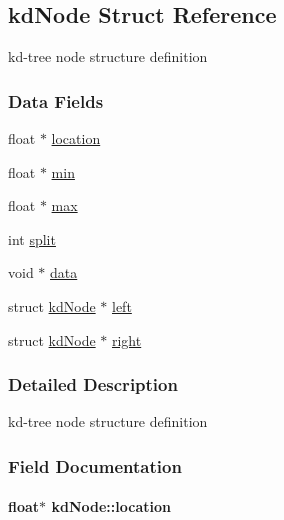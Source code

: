 \hypertarget{structkdNode}{
\subsection{kdNode Struct Reference}
\label{structkdNode}
}
kd-tree node structure definition  


\subsubsection*{Data Fields}
\begin{CompactItemize}
\item 
float $\ast$ \hyperlink{structkdNode_46d85dcb71115c78a9c755dc9958b6b9}{location}
\item 
float $\ast$ \hyperlink{structkdNode_585a4ffcc5380a36dd73ba1757b3e0ef}{min}
\item 
float $\ast$ \hyperlink{structkdNode_2d19c9682f6e0a51b571cfb81fb29c94}{max}
\item 
int \hyperlink{structkdNode_4750628c6641e6f346c1e2e20212e41d}{split}
\item 
void $\ast$ \hyperlink{structkdNode_c106e27d76af679582b4c8096a16402d}{data}
\item 
struct \hyperlink{structkdNode}{kdNode} $\ast$ \hyperlink{structkdNode_d797c034d815bcf07ed2d8ce42b4d3c7}{left}
\item 
struct \hyperlink{structkdNode}{kdNode} $\ast$ \hyperlink{structkdNode_0bfb521a721369f5108b20e32aa6b100}{right}
\end{CompactItemize}


\subsubsection{Detailed Description}
kd-tree node structure definition 

\subsubsection{Field Documentation}
\hypertarget{structkdNode_46d85dcb71115c78a9c755dc9958b6b9}{
\paragraph[location]{\setlength{\rightskip}{0pt plus 5cm}float$\ast$ {\bf kdNode::location}}\hfill}
\label{structkdNode_46d85dcb71115c78a9c755dc9958b6b9}


